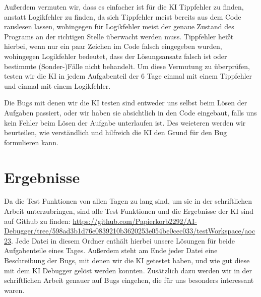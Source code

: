 \documentclass[a4paper,12pt,ngerman]{scrartcl}
\begin{document}
Außerdem vermuten wir, dass es einfacher ist für die KI Tippfehler zu finden, anstatt Logikfehler zu finden, da sich Tippfehler meist bereits aus dem Code rauslesen lassen, wohingegen für Logikfehler meist der genaue Zustand des Programs an der richtigen Stelle überwacht werden muss. Tippfehler heißt hierbei, wenn nur ein paar Zeichen im Code falsch eingegeben wurden, wohingegen Logikfehler bedeutet, dass der Lösungsansatz falsch ist oder bestimmte (Sonder-)Fälle nicht behandelt. Um diese Vermutung zu überprüfen, testen wir die KI in jedem Aufgabenteil der 6 Tage einmal mit einem Tippfehler und einmal mit einem Logikfehler.

Die Bugs mit denen wir die KI testen sind entweder uns selbst beim Lösen der Aufgaben passiert, oder wir haben sie absichtlich in den Code eingebaut, falls uns kein Fehler beim Lösen der Aufgabe unterlaufen ist. Des weieteren werden wir beurteilen, wie verständlich und hilfreich die KI den Grund für den Bug formulieren kann.

\section{Ergebnisse}

Da die Test Funktionen von allen Tagen zu lang sind, um sie in der schriftlichen Arbeit unterzubringen, sind alle Test Funktionen und die Ergebnisse der KI sind auf Github zu finden: \url{https://github.com/Papierkorb2292/AI-Debugger/tree/598ad3b1d76e0839210b3620253e054be0cec033/testWorkspace/aoc23}. Jede Datei in diesem Ordner enthält hierbei unsere Lösungen für beide Aufgabenteile eines Tages. Außerdem steht am Ende jeder Datei eine Beschreibung der Bugs, mit denen wir die KI getestet haben, und wie gut diese mit dem KI Debugger gelöst werden konnten. Zusätzlich dazu werden wir in der schriftlichen Arbeit genauer auf Bugs eingehen, die für uns besonders interessant waren.
\end{document}
